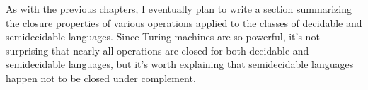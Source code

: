 \label{sec:closurepropertiesdecidable}

\begin{construction}
As with the previous chapters, I eventually plan to write a section summarizing the closure properties of various operations applied to the classes of decidable and semidecidable languages. Since Turing machines are so powerful, it's not surprising that nearly all operations are closed for both decidable and semidecidable languages, but it's worth explaining that semidecidable languages happen not to be closed under complement.
\end{construction}